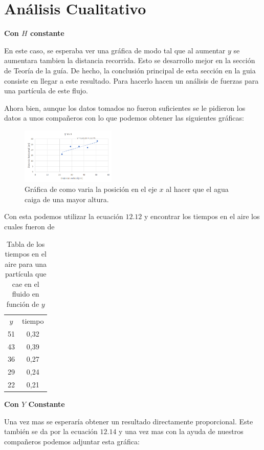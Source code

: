 \documentclass[a4paper, amsfonts, amssymb, amsmath, reprint, showkeys, nofootinbib, twoside]{revtex4-1}
\begin{document}
\section{Análisis Cualitativo}

\textbf{Con $H$ constante}

En este caso, se esperaba ver una gráfica de modo tal que al aumentar  $y$ se aumentara tambien la distancia recorrida. Esto se desarrollo mejor en la sección de Teoría de la guía. De hecho, la conclusión principal de esta sección en la guia consiste en llegar a este resultado. Para hacerlo hacen un análisis de fuerzas para una partícula de este flujo.

Ahora bien, aunque los datos tomados no fueron suficientes se le pidieron los datos a unos compañeros con lo que podemos obtener las siguientes gráficas:

 \begin{figure}[htpb]
  \centering
  \includegraphics[width=0.4\textwidth]{yvsx.png}
  \caption{Gráfica de como varia la posición en el eje $x$ al hacer que el agua caiga de una mayor altura.}
  \label{fig:yvsx}
\end{figure}

Con esta podemos utilizar la ecuación $12.12$ y encontrar los tiempos en el aire los cuales fueron de

 \begin{table}[htpb]
  \centering
  \caption{Tabla de los tiempos en el aire para una partícula que cae en el fluido en función de $y$} 
  \label{tab:label}
  \begin{tabular}{|c|c|} 
    \hline
    $y$ & tiempo \\
    51 & 0,32 \\
    43 & 0,39 \\
    36 & 0,27 \\
    29 & 0,24 \\
    22 & 0,21  \\
    \hline
  \end{tabular}
\end{table}

\textbf{Con $Y$ Constante}

Una vez mas se esperaría obtener un resultado directamente proporcional. Este también se da por la ecuación  $12.14$  y una vez mas con la ayuda de nuestros compañeros podemos adjuntar esta gráfica:
\end{document}
